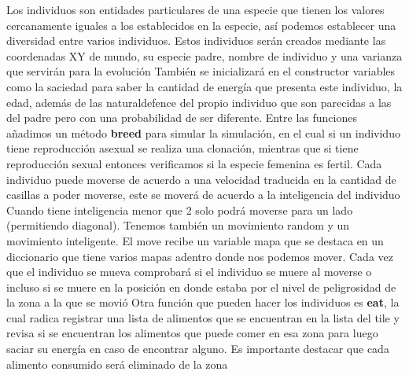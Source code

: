 \documentclass{llncs}
\begin{document}
Los individuos son entidades particulares de una especie que tienen los valores cercanamente iguales a los establecidos en la especie, así podemos establecer una diversidad entre varios individuos.
\newline
\newline
Estos individuos serán creados mediante las coordenadas XY de mundo, su especie padre, nombre de individuo y una varianza que servirán para la evolución
\newline
\newline
También se inicializará en el constructor variables como la saciedad para saber la cantidad de energía que presenta este individuo, la edad, además de las naturaldefence del propio individuo que son parecidas a las del padre pero con una probabilidad de ser diferente.
\newline
\newline
Entre las funciones añadimos un método \textbf{breed} para simular la simulación, en el cual si un individuo tiene reproducción asexual se realiza una clonación, mientras que si tiene reproducción sexual entonces verificamos si la especie femenina es fertil.
\newline
\newline
Cada individuo puede moverse de acuerdo a una velocidad traducida en la cantidad de casillas a poder moverse, este se moverá de acuerdo a la inteligencia del individuo
\newline
\newline
Cuando tiene inteligencia menor que 2 solo podrá moverse para un lado (permitiendo diagonal).
\newline
\newline
Tenemos también un movimiento random y un movimiento inteligente.
\newline
\newline
El move recibe un variable mapa que se destaca en un diccionario que tiene varios mapas adentro donde nos podemos mover.
\newline
\newline
Cada vez que el individuo se mueva comprobará si el individuo se muere al moverse o incluso si se muere en la posición en donde estaba por el nivel de peligrosidad de la zona a la que se movió
\newline
\newline
Otra función que pueden hacer los individuos es \textbf{eat}, la cual radica registrar una lista de alimentos que se encuentran en la lista del tile y revisa si se encuentran los alimentos que puede comer en esa zona para luego saciar su energía en caso de encontrar alguno. Es importante destacar que cada alimento consumido será eliminado de la zona
\end{document}

